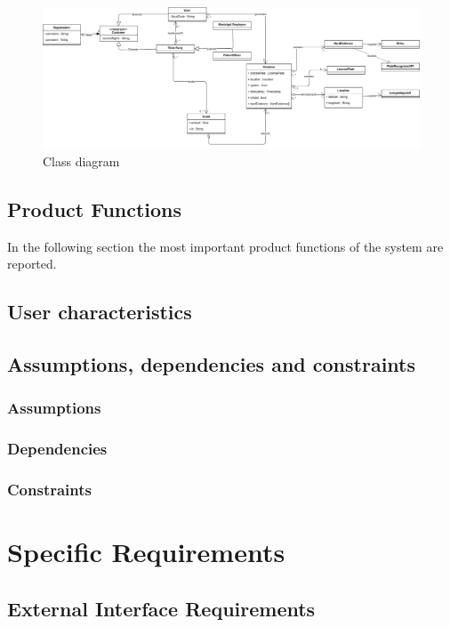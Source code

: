 \documentclass{article}
\begin{document}
\begin{figure}[H]
    \centering
    \includegraphics[scale=0.255]{Images/umlmodel}
    \caption{Class diagram}
\end{figure}

\subsection{Product Functions}
In the following section the most important product functions of the system are
reported.
\subsection{User characteristics}
\subsection{Assumptions, dependencies and constraints}
\subsubsection{Assumptions}
\subsubsection{Dependencies}
\subsubsection{Constraints}

\newpage
\section{Specific Requirements}
\subsection{External Interface Requirements}
\end{document}
